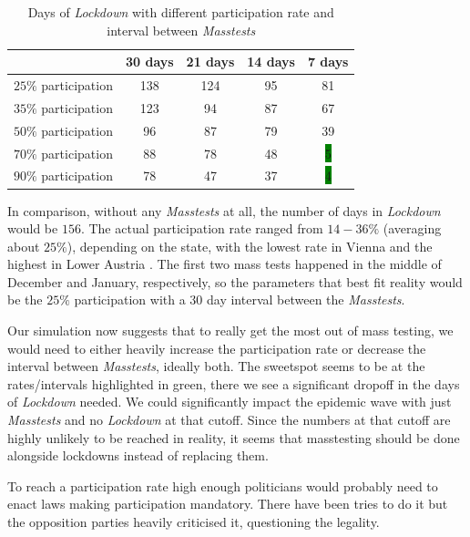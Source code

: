 \documentclass
[
    report,
    11pt,
    bibliography = totoc,
    listof = totoc,
    headinclude = true,
]
{scrreport}
\begin{document}
\begin{table}[!h]
{\small%
\begin{center}
\begin{tabular}{|c||c|c|c|c|}
\hline
& 30 days   & 21 days   & 14 days   & 7 days  \\
 \hline
 \hline
     $25\%$ participation & 138 &124 & 95 & 81\\
 \hline
     $35\%$ participation & 123 &  94&  87  & 67   \\
 \hline
     $50\%$ participation & 96 & 87 & 79 & 39\\
 \hline
   $70\%$ participation & 88 &  78 & 48 & \colorbox{green}{5} \\
 \hline
     $90\%$ participation & 78 & 47 & 37 & \colorbox{green}{4}\\
     \hline
\end{tabular}
\end{center}
}

\caption{Days of \textit{Lockdown} with different participation rate and interval between \textit{Masstests}}
\label{days_of_lockdown}
\end{table}
In comparison, without any \textit{Masstests} at all, the number of days in \textit{Lockdown} would be $156$. The actual participation rate ranged from $14 - 36\%$ (averaging about $25\%$), depending on the state, with the lowest rate in Vienna and the highest in Lower Austria \cite{MassTests}. The first two mass tests happened in the middle of December and January, respectively, so the parameters that best fit reality would be the $25\%$ participation with a $30$ day interval between the \textit{Masstests}.

Our simulation now suggests that to really get the most out of mass testing, we would need to either heavily increase the participation rate or decrease the interval between \textit{Masstests}, ideally both. The sweetspot seems to be at the rates/intervals highlighted in green, there we see a significant dropoff in the days of \textit{Lockdown} needed. We could significantly impact the epidemic wave with just \textit{Masstests} and no \textit{Lockdown} at that cutoff. Since the numbers at that cutoff are highly unlikely to be reached in reality, it seems that masstesting should be done alongside lockdowns instead of replacing them.

To reach a participation rate high enough politicians would probably need to enact laws making participation mandatory. There have been tries to do it but the opposition parties heavily criticised it, questioning the legality. \\
\end{document}
